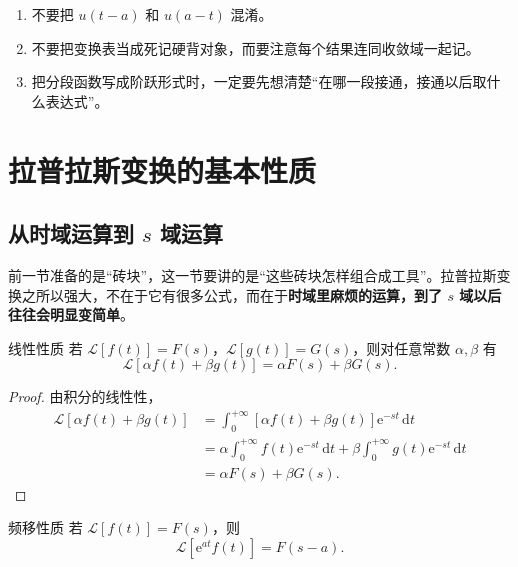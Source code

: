 \begin{jinshi}[这一节最容易错的地方]
\begin{enumerate}
    \item 不要把 $u(t-a)$ 和 $u(a-t)$ 混淆。
    \item 不要把变换表当成死记硬背对象，而要注意每个结果连同收敛域一起记。
    \item 把分段函数写成阶跃形式时，一定要先想清楚``在哪一段接通，接通以后取什么表达式''。
\end{enumerate}
\end{jinshi}

\section{拉普拉斯变换的基本性质}

\subsection{\texorpdfstring{从时域运算到 $s$ 域运算}{从时域运算到 s 域运算}}

前一节准备的是``砖块''，这一节要讲的是``这些砖块怎样组合成工具''。拉普拉斯变换之所以强大，不在于它有很多公式，而在于\textbf{时域里麻烦的运算，到了 $s$ 域以后往往会明显变简单}。

\begin{dingli}{线性性质}{}
若 $\mathcal{L}[f(t)]=F(s)$，$\mathcal{L}[g(t)]=G(s)$，则对任意常数 $\alpha,\beta$ 有
\[
    \mathcal{L}[\alpha f(t)+\beta g(t)]
    =
    \alpha F(s)+\beta G(s).
\]
\end{dingli}

\begin{proof}
由积分的线性性，
\begin{align}
    \mathcal{L}[\alpha f(t)+\beta g(t)]
    &=
    \int_0^{+\infty} [\alpha f(t)+\beta g(t)]\mathrm{e}^{-st}\,\mathrm{d}t \\
    &=
    \alpha\int_0^{+\infty} f(t)\mathrm{e}^{-st}\,\mathrm{d}t
    +
    \beta\int_0^{+\infty} g(t)\mathrm{e}^{-st}\,\mathrm{d}t \\
    &=
    \alpha F(s)+\beta G(s).
\end{align}
\end{proof}

\begin{dingli}{频移性质}{}
若 $\mathcal{L}[f(t)]=F(s)$，则
\[
    \mathcal{L}[\mathrm{e}^{at}f(t)]
    =
    F(s-a).
\]
\end{dingli}

